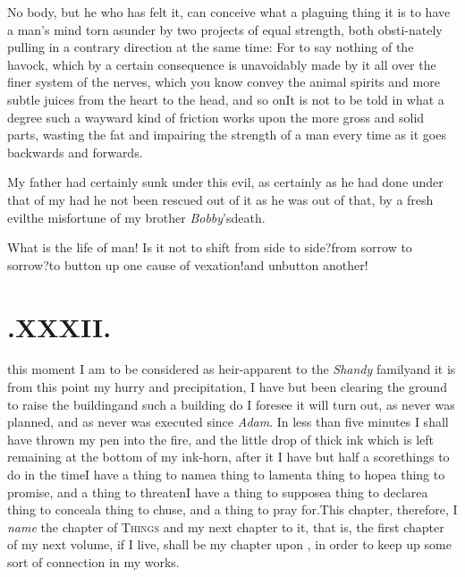 \documentclass{article}
\begin{document}
No body, but he who has felt it, can conceive what a plaguing
thing it is to have a man’s mind torn asunder by two projects
of equal strength, both obsti-\break nately pulling in a contrary direction
at the same time: For to say nothing of\break
the havock, which by a certain conse\-quence is unavoidably made by it all\break
over the finer system of the nerves,\break
which you know convey the animal\break
spirits and more subtle juices from the heart to the head, and so on\tsk It is\break
not to be told in what a degree such a wayward kind of friction works
upon the more gross and solid parts, wasting the fat and impairing
the strength of a man every time as it goes backwards and
forwards.

My father had certainly sunk under this evil, as certainly as he
had done under that of my \tsh\break had he not been rescued out of it as\break
he was out of that, by a fresh evil\tsh\break the misfortune of my
brother \textit{Bobby}’s\break death.

What is the life of man! Is it not to shift from side to
side?\tsk from sorrow to sorrow?\tsh to button up
one cause of vexation!\tsk and unbutton another!

\bigskip
\section{.\enspace XXXII.}

 this moment I am to be\break
considered as heir-apparent to the \textit{Shandy}
family\tsk and it is from this point
my hurry and precipitation, I have but
been clearing the ground to raise the\break
building\tsh and such a building do I\break
foresee it will turn out, as never was planned, and as never was executed since
\textit{Adam}. In less than five minutes I shall have thrown
my pen into the fire, and the little drop of thick ink which
is left remaining at the bottom of my ink-horn, after it\tsh
I have but half a score\break things to do in the time\tsh I have
a thing to name\tsh a thing to lament\tsh a thing to
hope\tsh a thing to promise, and a thing to threaten\tsk I
have a thing to suppose\tsk a thing to declare\tsh a thing
to conceal\tsh a thing to chuse, and a thing to pray
for.\tsh This chapter, therefore, I \textit{name} the chapter
of \textsc{Things}\tsh\break 
and my next chapter to it, that is, the\break
first chapter of my next volume, if I live,\break
shall be my chapter upon ,
in order to keep up some sort of connection in my works.
\end{document}
